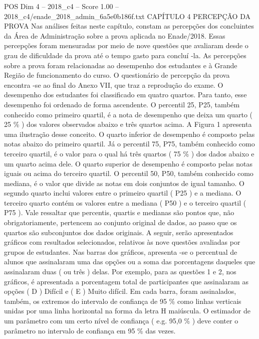 \begin{textsample}{POS Dim 4 – 2018\_c4 – Score 1.00 – 2018\_c4/enade\_2018\_admin\_6a5e0b186f.txt}  \label{ex:f4_pos_181}
CAPÍTULO 4 PERCEPÇÃO DA PROVA Nas análises feitas neste capítulo, constam as percepções dos concluintes da Área de Administração sobre a prova aplicada no Enade/2018.
Essas percepções foram mensuradas por meio de nove questões que avaliaram desde o grau de dificuldade da prova até o tempo gasto para concluí -la.
As percepções sobre a prova foram relacionadas ao desempenho dos estudantes e à Grande Região de funcionamento do curso.
O questionário de percepção da prova encontra -se ao final do Anexo VII, que traz a reprodução do exame.
O desempenho dos estudantes foi classificado em quatro quartos.
Para tanto, esse desempenho foi ordenado de forma ascendente.
O percentil 25, P25, também conhecido como primeiro quartil, é a nota de desempenho que deixa um quarto ( 25 \% ) dos valores observados abaixo e três quartos acima.
A Figura 1 apresenta uma ilustração desse conceito.
O quarto inferior de desempenho é composto pelas notas abaixo do primeiro quartil.
Já o percentil 75, P75, também conhecido como terceiro quartil, é o valor para o qual há três quartos ( 75 \% ) dos dados abaixo e um quarto acima dele.
O quarto superior de desempenho é composto pelas notas iguais ou acima do terceiro quartil.
O percentil 50, P50, também conhecido como mediana, é o valor que divide as notas em dois conjuntos de igual tamanho.
O segundo quarto inclui valores entre o primeiro quartil ( P25 ) e a mediana.
O terceiro quarto contém os valores entre a mediana ( P50 ) e o terceiro quartil ( P75 ).
Vale ressaltar que percentis, quartis e medianas são pontos que, não obrigatoriamente, pertencem ao conjunto original de dados, ao passo que os quartos são subconjuntos dos dados originais.
A seguir, serão apresentados gráficos com resultados selecionados, relativos às nove questões avaliadas por grupos de estudantes.
Nas barras dos gráficos, apresenta -se o percentual de alunos que assinalaram uma das opções ou a soma das porcentagens daqueles que assinalaram duas ( ou três ) delas.
Por exemplo, para as questões 1 e 2, nos gráficos, é apresentada a porcentagem total de participantes que assinalaram as opções ( D ) Difícil e ( E ) Muito difícil.
Em cada barra, foram assinalados, também, os extremos do intervalo de confiança de 95 \% como linhas verticais unidas por uma linha horizontal na forma da letra H maiúscula.
O estimador de um parâmetro com um certo nível de confiança ( e.g. 95,0 \% ) deve conter o parâmetro no intervalo de confiança em 95 \% das vezes.

\end{textsample}
